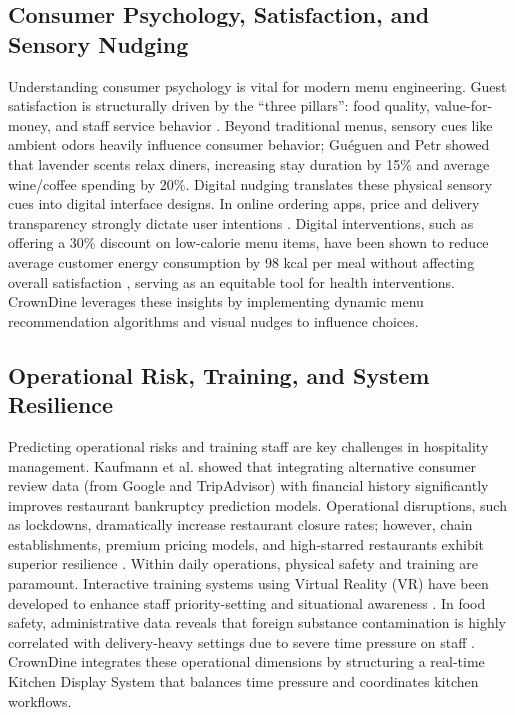 \documentclass[pdflatex,sn-mathphys-num]{sn-jnl}%
\theoremstyle{thmstyleone}%
\theoremstyle{thmstyletwo}%
\theoremstyle{thmstylethree}%
\begin{document}
\subsection{Consumer Psychology, Satisfaction, and Sensory Nudging}
Understanding consumer psychology is vital for modern menu engineering. Guest satisfaction is structurally driven by the ``three pillars'': food quality, value-for-money, and staff service behavior \cite{art8, art10}. Beyond traditional menus, sensory cues like ambient odors heavily influence consumer behavior; Gu{\'e}guen and Petr \cite{art13} showed that lavender scents relax diners, increasing stay duration by 15\% and average wine/coffee spending by 20\%. Digital nudging translates these physical sensory cues into digital interface designs. In online ordering apps, price and delivery transparency strongly dictate user intentions \cite{art7}. Digital interventions, such as offering a 30\% discount on low-calorie menu items, have been shown to reduce average customer energy consumption by 98 kcal per meal without affecting overall satisfaction \cite{art18}, serving as an equitable tool for health interventions. CrownDine leverages these insights by implementing dynamic menu recommendation algorithms and visual nudges to influence choices.

\subsection{Operational Risk, Training, and System Resilience}
Predicting operational risks and training staff are key challenges in hospitality management. Kaufmann et al. \cite{art1} showed that integrating alternative consumer review data (from Google and TripAdvisor) with financial history significantly improves restaurant bankruptcy prediction models. Operational disruptions, such as lockdowns, dramatically increase restaurant closure rates; however, chain establishments, premium pricing models, and high-starred restaurants exhibit superior resilience \cite{art11}. Within daily operations, physical safety and training are paramount. Interactive training systems using Virtual Reality (VR) have been developed to enhance staff priority-setting and situational awareness \cite{art5}. In food safety, administrative data reveals that foreign substance contamination is highly correlated with delivery-heavy settings due to severe time pressure on staff \cite{art9}. CrownDine integrates these operational dimensions by structuring a real-time Kitchen Display System that balances time pressure and coordinates kitchen workflows.
\end{document}
